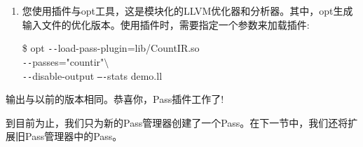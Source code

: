 \begin{enumerate}
	\item 您使用插件与opt工具，这是模块化的LLVM优化器和分析器。其中，opt生成输入文件的优化版本。使用插件时，需要指定一个参数来加载插件:
	\begin{tcolorbox}[colback=white,colframe=black]
		\$ opt \verb|--|load-pass-plugin=lib/CountIR.so \\
		\verb|--|passes="countir"$\setminus$ \\
		\hspace*{0.5cm}\verb|--|disable-output \verb|–-|stats demo.ll
	\end{tcolorbox}
	
\end{enumerate}

输出与以前的版本相同。恭喜你，Pass插件工作了!\par

到目前为止，我们只为新的Pass管理器创建了一个Pass。在下一节中，我们还将扩展旧Pass管理器中的Pass。\par




















